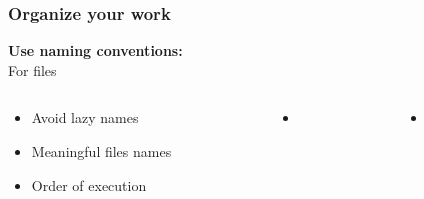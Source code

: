 \documentclass[xcolor=x11names,compress]{beamer}
\renewcommand{\(}{\begin{columns}}
\renewcommand{\)}{\end{columns}}
\newcommand{\<}[1]{\begin{column}{#1}}
\renewcommand{\>}{\end{column}}
\begin{document}
\begin{frame}
\frametitle{Organize your work }
\textcolor{siap}{\textbf{Use naming conventions: } \\ }
For files\\
\begin{columns}[t]
 \begin{column}{0.3\textwidth}
    \begin{itemize}[<+->]
   \item Avoid  lazy names
   \item Meaningful files names
   \item Order of execution
    \end{itemize}
\end{column}
  \begin{column}{0.2\textwidth}
    \begin{itemize}
       \item[]
    \end{itemize}
  \end{column}
  \begin{column}{0.5\textwidth}
    \begin{itemize}
        \item[]

    \end{itemize}
  \end{column}
\end{columns}
\end{frame}
\end{document}
